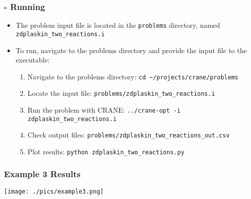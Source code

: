 \begin{frame}[fragile]
	\frametitle{\insertsubsectionhead \hspace{1pt} - Running}
		\begin{itemize}
			\item The problem input file is located in the \texttt{problems} directory, named \texttt{zdplaskin\_two\_reactions.i}
			\item To run, navigate to the problems directory and provide the input file to the executable:
			\begin{enumerate}
				\item Navigate to the problems directory: \newline
				\hspace*{8pt} \texttt{cd \textasciitilde/projects/crane/problems}
				\item Locate the input file: \newline
				\hspace*{8pt} \texttt{problems/zdplaskin\_two\_reactions.i}
				\item Run the problem with CRANE: \newline
				\hspace*{8pt} \texttt{../crane-opt -i zdplaskin\_two\_reactions.i}
				\item Check output files: \newline
				\hspace*{8pt} \texttt{problems/zdplaskin\_two\_reactions\_out.csv}
				\item Plot results: \newline
				\hspace*{8pt} \texttt{python zdplaskin\_two\_reactions.py}
			\end{enumerate}
		\end{itemize}
\end{frame}

\begin{frame}
	\frametitle{Example 3 Results}
	\centering
	\texttt{[image: ./pics/example3.png]}
\end{frame}